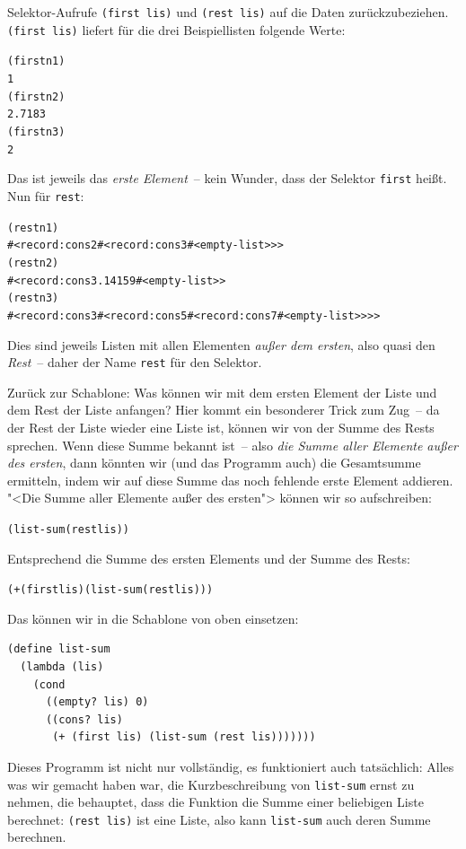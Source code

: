 Selektor-Aufrufe \texttt{(first lis)} und \texttt{(rest lis)} auf die
Daten zurückzubeziehen.  \texttt{(first lis)} liefert für die drei
Beispiellisten folgende Werte:
%
\begin{alltt}
(first n1)
\evalsto{} 1
(first n2)
\evalsto{} 2.7183
(first n3)
\evalsto{} 2
\end{alltt}
%
Das ist jeweils das \emph{erste Element}~-- kein Wunder, dass der
Selektor \texttt{first} heißt.  Nun für \texttt{rest}:
%
\begin{alltt}
(rest n1)
\evalsto{} #<record:cons 2 #<record:cons 3 #<empty-list>>>
(rest n2)
\evalsto{}  #<record:cons 3.14159 #<empty-list>>
(rest n3)
\evalsto{} #<record:cons 3 #<record:cons 5 #<record:cons 7 #<empty-list>>>>
\end{alltt}
%
Dies sind jeweils Listen mit allen Elementen \emph{außer dem
  ersten}, also quasi den \emph{Rest}~-- daher der Name \texttt{rest}
für den Selektor.

Zurück zur Schablone: Was können wir mit dem ersten Element der Liste
und dem Rest der Liste anfangen?  Hier kommt ein besonderer Trick zum
Zug~-- da der Rest der Liste wieder eine Liste ist, können
wir von der Summe des Rests sprechen.  Wenn diese Summe bekannt
ist~-- also \emph{die Summe aller Elemente außer des ersten}, dann
könnten wir (und das Programm auch) die Gesamtsumme ermitteln, indem wir
auf diese Summe das noch fehlende erste Element addieren.  "<Die Summe
aller Elemente außer des ersten"> können wir so aufschreiben:
%
\begin{alltt}
(list-sum (rest lis))
\end{alltt}
%
Entsprechend die Summe des ersten Elements und der Summe des Rests:
%
\begin{alltt}
(+ (first lis) (list-sum (rest lis)))
\end{alltt}
%
Das können wir in die Schablone von oben einsetzen:
%
\begin{verbatim}
(define list-sum
  (lambda (lis)
    (cond
      ((empty? lis) 0)
      ((cons? lis)
       (+ (first lis) (list-sum (rest lis)))))))
\end{verbatim}
%
Dieses Programm ist nicht nur vollständig, es funktioniert auch
tatsächlich: Alles was wir gemacht haben war, die Kurzbeschreibung
von \texttt{list-sum} ernst zu nehmen, die behauptet, dass die Funktion
die Summe einer beliebigen Liste berechnet: \texttt{(rest lis)} ist
eine Liste, also kann \texttt{list-sum} auch deren Summe berechnen.

